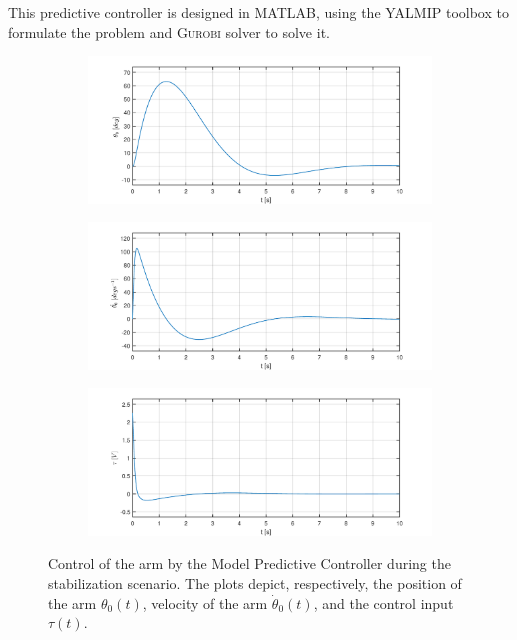 This predictive controller is designed in \textsc{MATLAB}, using the \textsc{YALMIP} toolbox \cite{YALMIP} to formulate the problem and \textsc{Gurobi} solver to solve it.
\begin{figure}[H]
	\centering
	\begin{subfigure}
		\centering
		\includegraphics[scale=0.6]{images/MPC/arm.pdf}  
	\end{subfigure}
	\begin{subfigure}
		\centering
		\includegraphics[scale=0.6]{images/MPC/darm.pdf}  
	\end{subfigure}
	\begin{subfigure}
		\centering
		\includegraphics[scale=0.6]{images/MPC/control.pdf}  
	\end{subfigure}
	\caption{Control of the arm by the Model Predictive Controller during the stabilization scenario. The plots depict, respectively, the position of the arm $\theta_0(t)$, velocity of the arm $\dot{\theta}_0(t)$, and the control input $\tau(t)$.}
	\label{mpc}
\end{figure}
